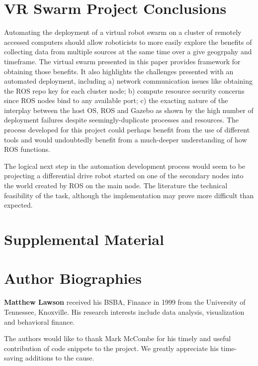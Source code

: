 \documentclass[9pt,twocolumn,twoside]{../../styles/osajnl}
\begin{document}
\section{VR Swarm Project Conclusions}
Automating the deployment of a virtual robot swarm on a cluster of remotely accessed computers should allow roboticists to more easily explore the benefits of collecting data from multiple sources at the same time over a give geogrpahy and timeframe.  The virtual swarm presented in this paper provides framework for obtaining those benefits. It also highlights the challenges presented with an automated deployment, including a) network communication issues like obtaining the ROS repo key for each cluster node; b) compute resource security concerns since ROS nodes bind to any available port; c) the exacting nature of the interplay between the host OS, ROS and Gazebo as shown by the high number of deployment failures despite seemingly-duplicate processes and resources.  The process developed for this project could perhaps benefit from the use of different tools and would undoubtedly benefit from a much-deeper understanding of how ROS functions.

The logical next step in the automation development process would seem to be projecting a differential drive robot started on one of the secondary nodes into the world created by ROS on the main node.  The literature the technical feasibility of the task, although the implementation may prove more difficult than expected.

\section{Supplemental Material}



 
\section*{Author Biographies}
\begingroup
\setlength\intextsep{0pt}
\begin{minipage}[t][3.2cm][t]{1.0\columnwidth} %
  \noindent
  {\bfseries Matthew Lawson} received his BSBA, Finance in 1999 from
  the University of Tennessee, Knoxville. His research interests include
  data analysis, visualization and behavioral finance.
\end{minipage}
\endgroup

\appendix
\begin{description}

\item The authors would like to thank Mark McCombe for his timely and useful contribution of code snippets  to the project.  We greatly appreciate his time-saving additions to the cause.

\end{description}
\end{document}
